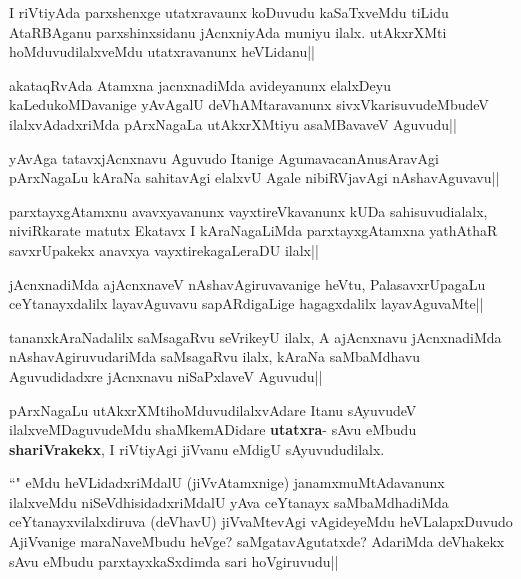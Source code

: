 \begin{artha}
I riVtiyAda parxshenxge utatxravaunx koDuvudu kaSaTxveMdu tiLidu AtaRBAganu 
parxshinxsidanu jAcnxniyAda muniyu ilalx. utAkxrXMti hoMduvudilalxveMdu utatxravanunx 
heVLidanu||
\end{artha}

\begin{artha}
akataqRvAda Atamxna jacnxnadiMda avideyanunx elalxDeyu kaLedukoMDavanige yAvAgalU deVhAMtaravanunx sivxVkarisuvudeMbudeV ilalxvAdadxriMda pArxNagaLa utAkxrXMtiyu asaMBavaveV Aguvudu||
\end{artha}

\begin{artha}
yAvAga tatavxjAcnxnavu Aguvudo Itanige AgumavacanAnusAravAgi pArxNagaLu kAraNa sahitavAgi elalxvU Agale nibiRVjavAgi nAshavAguvavu||
\end{artha}

\begin{artha}
parxtayxgAtamxnu avavxyavanunx vayxtireVkavanunx kUDa sahisuvudialalx, niviRkarate matutx Ekatavx I kAraNagaLiMda parxtayxgAtamxna yathAthaR savxrUpakekx anavxya vayxtirekagaLeraDU ilalx||
\end{artha}


\begin{artha}
jAcnxnadiMda ajAcnxnaveV nAshavAgiruvavanige heVtu, PalasavxrUpagaLu ceYtanayxdalilx 
layavAguvavu sapARdigaLige hagagxdalilx layavAguvaMte||
\end{artha}

\begin{artha}
tananxkAraNadalilx saMsagaRvu seVrikeyU ilalx, A  ajAcnxnavu jAcnxnadiMda 
nAshavAgiruvudariMda saMsagaRvu ilalx, kAraNa saMbaMdhavu Aguvudidadxre jAcnxnavu 
niSaPxlaveV Aguvudu||
\end{artha}


\begin{artha}
pArxNagaLu utAkxrXMtihoMduvudilalxvAdare Itanu sAyuvudeV ilalxveMDaguvudeMdu shaMkemADidare \textbf{utatxra}- sAvu eMbudu \textbf{shariVrakekx}, I riVtiyAgi jiVvanu eMdigU sAyuvududilalx. 
\end{artha}


\begin{artha}
``\stext" eMdu heVLidadxriMdalU (jiVvAtamxnige) janamxmuMtAdavanunx ilalxveMdu 
niSeVdhisidadxriMdalU yAva ceYtanayx saMbaMdhadiMda ceYtanayxvilalxdiruva (deVhavU) 
jiVvaMtevAgi vAgideyeMdu heVLalapxDuvudo AjiVvanige maraNaveMbudu heVge? 
saMgatavAgutatxde? AdariMda deVhakekx sAvu eMbudu parxtayxkaSxdimda sari hoVgiruvudu||
\end{artha}


